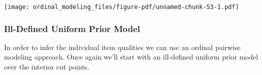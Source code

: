 \documentclass[
  letterpaper,
  DIV=11,
  numbers=noendperiod]{scrartcl}
\newenvironment{Shaded}{\begin{snugshade}}{\end{snugshade}}
\newcommand{\AttributeTok}[1]{\textcolor[rgb]{0.40,0.45,0.13}{#1}}
\newcommand{\ControlFlowTok}[1]{\textcolor[rgb]{0.00,0.23,0.31}{#1}}
\newcommand{\DecValTok}[1]{\textcolor[rgb]{0.68,0.00,0.00}{#1}}
\newcommand{\FloatTok}[1]{\textcolor[rgb]{0.68,0.00,0.00}{#1}}
\newcommand{\FunctionTok}[1]{\textcolor[rgb]{0.28,0.35,0.67}{#1}}
\newcommand{\NormalTok}[1]{\textcolor[rgb]{0.00,0.23,0.31}{#1}}
\newcommand{\SpecialCharTok}[1]{\textcolor[rgb]{0.37,0.37,0.37}{#1}}
\newcommand{\StringTok}[1]{\textcolor[rgb]{0.13,0.47,0.30}{#1}}
\begin{document}
\begin{Shaded}
\end{Shaded}

\texttt{[image: ordinal\_modeling\_files/figure-pdf/unnamed-chunk-53-1.pdf]}

\subsubsection{Ill-Defined Uniform Prior
Model}\label{ill-defined-uniform-prior-model}

In order to infer the individual item qualities we can use an ordinal
pairwise modeling approach. Once again we'll start with an ill-defined
uniform prior model over the interior cut points.
\end{document}
